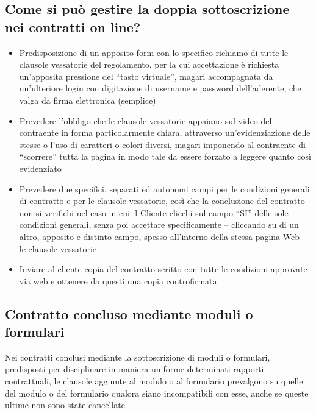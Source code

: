 \subsection{Come si può gestire la doppia sottoscrizione nei contratti on line?}
\begin{itemize}
    \item Predisposizione di un apposito form con lo specifico richiamo di
        tutte le clausole vessatorie del regolamento, per la cui accettazione è
        richiesta un'apposita pressione del “tasto virtuale”, magari
        accompagnata da un'ulteriore login con digitazione di username e
        password dell'aderente, che valga da firma elettronica (semplice)
    \item Prevedere l'obbligo che le clausole vessatorie appaiano sul video del
        contraente in forma particolarmente chiara, attraverso
        un'evidenziazione delle stesse o l'uso di caratteri o colori diversi,
        magari imponendo al contraente di “scorrere” tutta la pagina in modo
        tale da essere forzato a leggere quanto così evidenziato
    \item Prevedere due specifici, separati ed autonomi campi per le condizioni
        generali di contratto e per le clausole vessatorie, così che la
        conclusione del contratto non si verifichi nel caso in cui il Cliente
        clicchi sul campo “SI” delle sole condizioni generali, senza poi
        accettare specificamente – cliccando su di un altro, apposito e
        distinto campo, spesso all'interno della stessa pagina Web – le
        clausole vessatorie
    \item Inviare al cliente copia del contratto scritto con tutte le
        condizioni approvate via web e ottenere da questi una copia
        controfirmata
\end{itemize}

\subsection{Contratto concluso mediante moduli o formulari}
Nei contratti conclusi mediante la sottoscrizione di moduli o formulari, predisposti per disciplinare in maniera uniforme determinati
rapporti contrattuali, le clausole aggiunte al modulo o al formulario prevalgono su quelle del modulo o del formulario qualora siano
incompatibili con esse, anche se queste ultime non sono state cancellate

